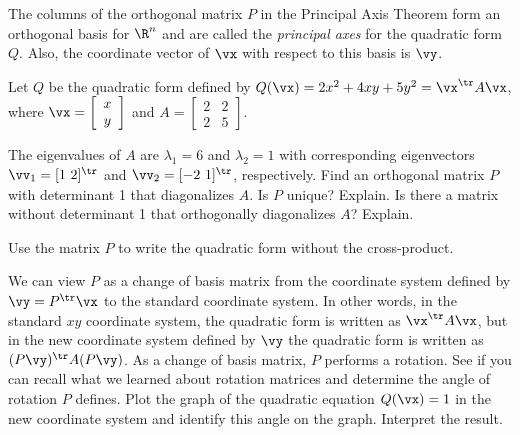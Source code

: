 The columns of the orthogonal matrix $P$ in the Principal Axis Theorem form an orthogonal basis for $\R^n$ and are called the \emph{principal axes} for the quadratic form $Q$. Also, the coordinate vector of $\vx$ with respect to this basis is $\vy$.

\begin{activity} Let $Q$ be the quadratic form defined by $Q(\vx) = 2x^2 + 4xy + 5y^2 = \vx^{\tr} A \vx$, where $\vx = \left[ \begin{array}{c} x \\ y \end{array} \right]$ and $A = \left[ \begin{array}{cc}2&2\\2&5 \end{array} \right]$. 
    \ba


    \item The eigenvalues of $A$ are $\lambda_1 = 6$ and $\lambda_2=1$ with corresponding eigenvectors $\vv_1 = [1 \ 2]^{\tr}$ and $\vv_2 = [-2 \ 1]^{\tr}$, respectively. Find an orthogonal matrix $P$ with determinant 1 that diagonalizes $A$. Is $P$ unique? Explain. Is there a matrix without determinant 1 that orthogonally diagonalizes $A$? Explain.

    
    \item Use the matrix $P$ to write the quadratic form without the cross-product.

    \item We can view $P$ as a change of basis matrix from the coordinate system defined by $\vy = P^{\tr} \vx$ to the standard coordinate system. In other words, in the standard $xy$ coordinate system, the quadratic form is written as $\vx^{\tr}A \vx$, but in the new coordinate system defined by $\vy$ the quadratic form is written as $(P\vy)^{\tr}A(P\vy)$. As a change of basis matrix, $P$ performs a rotation. See if you can recall what we learned about rotation matrices and determine the angle of rotation $P$ defines. Plot the graph of the quadratic equation $Q(\vx) = 1$ in the new coordinate system and identify this angle on the graph. Interpret the result.

    \ea

\end{activity}

\label{sec:class_quad_forms}

